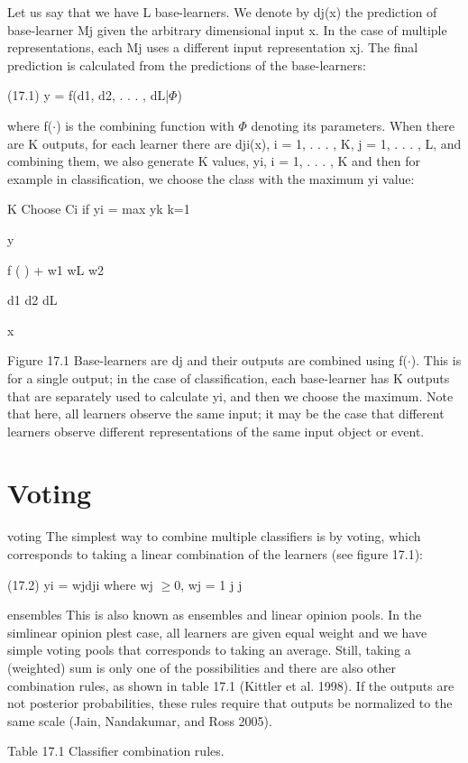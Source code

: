Let us say that we have L base-learners. We denote by dj(x) the prediction of base-learner Mj given the arbitrary dimensional input x. In the case of multiple representations, each Mj uses a different input representation xj. The final prediction is calculated from the predictions of the base-learners:

(17.1) y = f(d1, d2, . . . , dL|$\Phi$)

where f($\cdot$) is the combining function with $\Phi$ denoting its parameters. When there are K outputs, for each learner there are dji(x), i = 1, . . . , K, j = 1, . . . , L, and combining them, we also generate K values, yi, i = 1, . . . , K and then for example in classification, we choose the class with the maximum yi value:

K Choose Ci if yi = max yk k=1

y

f ( ) + w1 wL w2

d1 d2 dL

x

Figure 17.1 Base-learners are dj and their outputs are combined using f($\cdot$). This is for a single output; in the case of classification, each base-learner has K outputs that are separately used to calculate yi, and then we choose the maximum. Note that here, all learners observe the same input; it may be the case that different learners observe different representations of the same input object or event.

\section{Voting}

voting The simplest way to combine multiple classifiers is by voting, which corresponds to taking a linear combination of the learners (see figure 17.1):

(17.2) yi = wjdji where wj $\geq$0, wj = 1 j j

ensembles This is also known as ensembles and linear opinion pools. In the simlinear opinion plest case, all learners are given equal weight and we have simple voting pools that corresponds to taking an average. Still, taking a (weighted) sum is only one of the possibilities and there are also other combination rules, as shown in table 17.1 (Kittler et al. 1998). If the outputs are not posterior probabilities, these rules require that outputs be normalized to the same scale (Jain, Nandakumar, and Ross 2005).

Table 17.1 Classifier combination rules.

